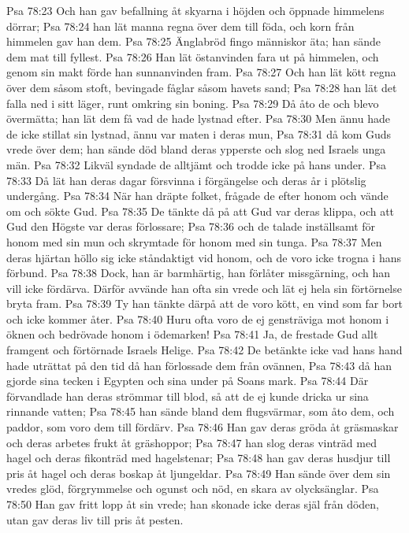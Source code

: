 Psa 78:23  Och han gav befallning åt skyarna i höjden och öppnade himmelens dörrar;
Psa 78:24  han lät manna regna över dem till föda, och korn från himmelen gav han dem.
Psa 78:25  Änglabröd fingo människor äta; han sände dem mat till fyllest.
Psa 78:26  Han lät östanvinden fara ut på himmelen, och genom sin makt förde han sunnanvinden fram.
Psa 78:27  Och han lät kött regna över dem såsom stoft, bevingade fåglar såsom havets sand;
Psa 78:28  han lät det falla ned i sitt läger, runt omkring sin boning.
Psa 78:29  Då åto de och blevo övermätta; han lät dem få vad de hade lystnad efter.
Psa 78:30  Men ännu hade de icke stillat sin lystnad, ännu var maten i deras mun,
Psa 78:31  då kom Guds vrede över dem; han sände död bland deras ypperste och slog ned Israels unga män.
Psa 78:32  Likväl syndade de alltjämt och trodde icke på hans under.
Psa 78:33  Då lät han deras dagar försvinna i förgängelse och deras år i plötslig undergång.
Psa 78:34  När han dräpte folket, frågade de efter honom och vände om och sökte Gud.
Psa 78:35  De tänkte då på att Gud var deras klippa, och att Gud den Högste var deras förlossare;
Psa 78:36  och de talade inställsamt för honom med sin mun och skrymtade för honom med sin tunga.
Psa 78:37  Men deras hjärtan höllo sig icke ståndaktigt vid honom, och de voro icke trogna i hans förbund.
Psa 78:38  Dock, han är barmhärtig, han förlåter missgärning, och han vill icke fördärva. Därför avvände han ofta sin vrede och lät ej hela sin förtörnelse bryta fram.
Psa 78:39  Ty han tänkte därpå att de voro kött, en vind som far bort och icke kommer åter.
Psa 78:40  Huru ofta voro de ej gensträviga mot honom i öknen och bedrövade honom i ödemarken!
Psa 78:41  Ja, de frestade Gud allt framgent och förtörnade Israels Helige.
Psa 78:42  De betänkte icke vad hans hand hade uträttat på den tid då han förlossade dem från ovännen,
Psa 78:43  då han gjorde sina tecken i Egypten och sina under på Soans mark.
Psa 78:44  Där förvandlade han deras strömmar till blod, så att de ej kunde dricka ur sina rinnande vatten;
Psa 78:45  han sände bland dem flugsvärmar, som åto dem, och paddor, som voro dem till fördärv.
Psa 78:46  Han gav deras gröda åt gräsmaskar och deras arbetes frukt åt gräshoppor;
Psa 78:47  han slog deras vinträd med hagel och deras fikonträd med hagelstenar;
Psa 78:48  han gav deras husdjur till pris åt hagel och deras boskap åt ljungeldar.
Psa 78:49  Han sände över dem sin vredes glöd, förgrymmelse och ogunst och nöd, en skara av olycksänglar.
Psa 78:50  Han gav fritt lopp åt sin vrede; han skonade icke deras själ från döden, utan gav deras liv till pris åt pesten.
